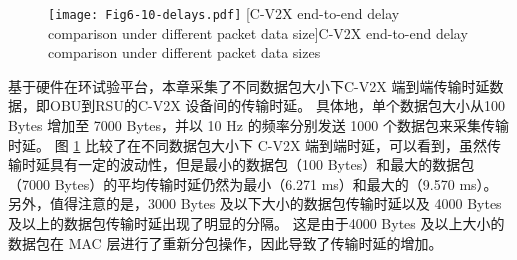 \begin{figure}[h]
\centering
  \texttt{[image: Fig6-10-delays.pdf]}
  [C-V2X end-to-end delay comparison under different packet data size]{C-V2X end-to-end delay comparison under different packet data sizes}
  \label{fig 5-10}
\end{figure}

基于硬件在环试验平台，本章采集了不同数据包大小下C-V2X 端到端传输时延数据，即OBU到RSU的C-V2X 设备间的传输时延。
具体地，单个数据包大小从100 Bytes 增加至 7000 Bytes，并以 10 Hz 的频率分别发送 1000 个数据包来采集传输时延。
图 \ref{fig 5-10} 比较了在不同数据包大小下 C-V2X 端到端时延，可以看到，虽然传输时延具有一定的波动性，但是最小的数据包（100 Bytes）和最大的数据包（7000 Bytes）的平均传输时延仍然为最小（6.271 ms）和最大的（9.570 ms）。
另外，值得注意的是，3000 Bytes 及以下大小的数据包传输时延以及 4000 Bytes 及以上的数据包传输时延出现了明显的分隔。
这是由于4000 Bytes 及以上大小的数据包在 MAC 层进行了重新分包操作，因此导致了传输时延的增加。

